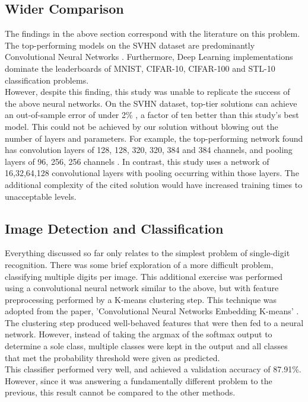 \documentclass[12pt]{article}
\begin{document}
\subsection{Wider Comparison}

The findings in the above section correspond with the literature on this problem. The top-performing models on the SVHN dataset are predominantly Convolutional Neural Networks \citep{problemperformance}. Furthermore, Deep Learning implementations dominate the leaderboards of MNIST, CIFAR-10, CIFAR-100 and STL-10 classification problems.\\

However, despite this finding, this study was unable to replicate the success of the above neural networks. On the SVHN dataset, top-tier solutions can achieve an out-of-sample error of under 2\% \citep{problemperformance}, a factor of ten better than this study's best model. This could not be achieved by our solution without blowing out the number of layers and parameters. For example, the top-performing network found has convolution layers of 128, 128, 320, 320, 384 and 384 channels, and pooling layers of 96, 256, 256 channels \citep{bestsvhn}. In contrast, this study uses a network of 16,32,64,128 convolutional layers with pooling occurring within those layers. The additional complexity of the cited solution would have increased training times to unacceptable levels.

\subsection{Image Detection and Classification}

Everything discussed so far only relates to the simplest problem of single-digit recognition. There was some brief exploration of a more difficult problem, classifying multiple digits per image. This additional exercise was performed using a convolutional neural network similar to the above, but with feature preprocessing performed by a K-means clustering step. This technique was adopted from the paper, 'Convolutional Neural Networks Embedding K-means' \citep{kmeanscnn}. The clustering step produced well-behaved features that were then fed to a neural network. However, instead of taking the argmax of the softmax output to determine a sole class, multiple classes were kept in the output and all classes that met the probability threshold were given as predicted.\\

This classifier performed very well, and achieved a validation accuracy of 87.91\%. However, since it was answering a fundamentally different problem to the previous, this result cannot be compared to the other methods.\\
\end{document}
